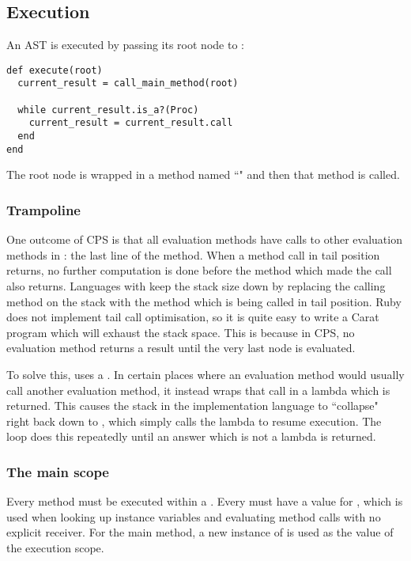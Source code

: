 \subsection{Execution}

An AST is executed by passing its root node to :

\begin{lstlisting}
def execute(root)
  current_result = call_main_method(root)
  
  while current_result.is_a?(Proc)
    current_result = current_result.call
  end
end
\end{lstlisting}

The root node is wrapped in a method named ``" and then that method is called.

\subsubsection{Trampoline}

One outcome of CPS is that all evaluation methods have calls to other evaluation methods in : the last line of the method. When a method call in tail position returns, no further computation is done before the method which made the call also returns. Languages with  keep the stack size down by replacing the calling method on the stack with the method which is being called in tail position. Ruby does not implement tail call optimisation, so it is quite easy to write a Carat program which will exhaust the stack space. This is because in CPS, no evaluation method returns a result until the very last node is evaluated.

To solve this,  uses a . In certain places where an evaluation method would usually call another evaluation method, it instead wraps that call in a lambda which is returned. This causes the stack in the implementation language to ``collapse" right back down to , which simply calls the lambda to resume execution. The  loop does this repeatedly until an answer which is not a lambda is returned.

\subsubsection{The main scope}

Every method must be executed within a . Every  must have a value for , which is used when looking up instance variables and evaluating method calls with no explicit receiver. For the main method, a new instance of  is used as the  value of the execution scope.

